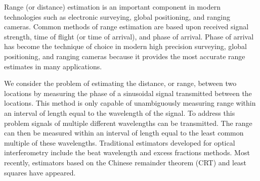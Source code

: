  \label{Summary}
%

Range (or distance) estimation is an important component in modern technologies such as electronic surveying, global positioning, and ranging cameras. Common methods of range estimation are based upon received signal strength, time of flight (or time of arrival), and phase of arrival. Phase of arrival has become the technique of choice in modern high precision surveying, global positioning, and ranging cameras because it provides the most accurate range estimates in many applications. 

 
We consider the problem of estimating the distance, or range, between two locations by measuring the phase of a sinusoidal signal transmitted between the locations. This method is only capable of unambiguously measuring range within an interval of length equal to the wavelength of the signal. To address this problem signals of multiple different wavelengths can be transmitted.  The range can then be measured within an interval of length equal to the least common multiple of these wavelengths. Traditional estimators developed for optical interferometry include the beat wavelength and excess fractions methods.  Most recently, estimators based on the Chinese remainder theorem (CRT) and least squares have appeared.

